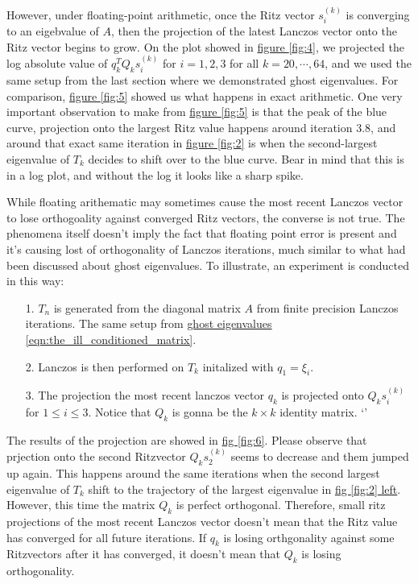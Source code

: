 \documentclass[]{article}
\theoremstyle{definition}
\begin{document}
            However, under floating-point arithmetic, once the Ritz vector $s_i^{(k)}$ is converging to an eigebvalue of $A$, then the projection of the latest Lanczos vector onto the Ritz vector begins to grow. On the plot showed in \hyperref[fig:4]{figure \ref*{fig:4}}, we projected the log absolute value of $q_k^TQ_ks_i^{(k)}$ for $i=1, 2, 3$ for all $k=20, \cdots, 64$, and we used the same setup from the last section where we demonstrated ghost eigenvalues. For comparison, \hyperref[fig:5]{figure \ref*{fig:5}} showed us what happens in exact arithmetic. One very important observation to make from \hyperref[fig:5]{figure \ref*{fig:5}} is that the peak of the blue curve, projection onto the largest Ritz value happens around iteration 3.8, and around that exact same iteration in \hyperref[fig:2]{figure \ref*{fig:2}} is when the second-largest eigenvalue of $T_k$ decides to shift over to the blue curve. Bear in mind that this is in a log plot, and without the log it looks like a sharp spike. 
            \par
            While floating arithematic may sometimes cause the most recent Lanczos vector to lose orthogoality against converged Ritz vectors, the converse is not true. The phenomena itself doesn't imply the fact that floating point error is present and it's causing lost of orthogonality of Lanczos iterations, much similar to what had been discussed about ghost eigenvalues. To illustrate, an experiment is conducted in this way: 
            \begin{enumerate}
                \item [1.] $T_n$ is generated from the diagonal matrix $A$ from finite precision Lanczos iterations. The same setup from \hyperref[eqn:the_ill_conditioned_matrix]{ghost eigenvalues \ref*{eqn:the_ill_conditioned_matrix}}. 
                \item [2.] Lanczos is then performed on $T_k$ initalized with $q_1 = \xi_i$. 
                \item [3.] The projection the most recent lanczos vector $q_k$ is projected onto $Q_ks_i^{(k)}$ for $1\le i \le 3$. Notice that $Q_k$ is gonna be the $k\times k$ identity matrix. `'
            \end{enumerate}
            The results of the projection are showed in \hyperref[fig:6]{fig \ref*{fig:6}}. Please observe that prjection onto the second Ritzvector $Q_ks_2^{(k)}$ seems to decrease and them jumped up again. This happens around the same iterations when the second largest eigenvalue of $T_k$ shift to the trajectory of the largest eigenvalue in \hyperref[fig:2]{fig \ref*{fig:2} left}. However, this time the matrix $Q_k$ is perfect orthogonal. Therefore, small ritz projections of the most recent Lanczos vector doesn't mean that the Ritz value has converged for all future iterations. If $q_k$ is losing orthgonality against some Ritzvectors after it has converged, it doesn't mean that $Q_k$ is losing orthogonality. 
\end{document}
